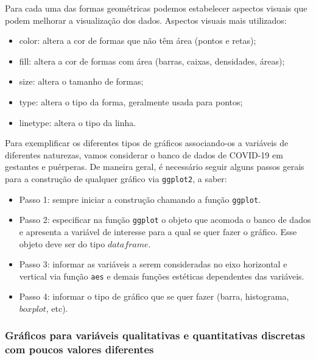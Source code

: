 \documentclass[
  letterpaper,
  DIV=11,
  numbers=noendperiod]{scrreprt}
\providecommand{\tightlist}{%
  \setlength{\itemsep}{0pt}\setlength{\parskip}{0pt}}\usepackage{longtable,booktabs,array}
\begin{document}
Para cada uma das formas geométricas podemos estabelecer aspectos
visuais que podem melhorar a visualização dos dados. Aspectos visuais
mais utilizados:

\begin{itemize}
\item
  color: altera a cor de formas que não têm área (pontos e retas);
\item
  fill: altera a cor de formas com área (barras, caixas, densidades,
  áreas);
\item
  size: altera o tamanho de formas;
\item
  type: altera o tipo da forma, geralmente usada para pontos;
\item
  linetype: altera o tipo da linha.
\end{itemize}

Para exemplificar os diferentes tipos de gráficos associando-os a
variáveis de diferentes naturezas, vamos considerar o banco de dados de
COVID-19 em gestantes e puérperas. De maneira geral, é necessário seguir
alguns passos gerais para a construção de qualquer gráfico via
\texttt{ggplot2}, a saber:

\begin{itemize}
\tightlist
\item
  Passo 1: sempre iniciar a construção chamando a função
  \texttt{ggplot}.
\item
  Passo 2: especificar na função \texttt{ggplot} o objeto que acomoda o
  banco de dados e apresenta a variável de interesse para a qual se quer
  fazer o gráfico. Esse objeto deve ser do tipo \(dataframe\).
\item
  Passo 3: informar as variáveis a serem consideradas no eixo horizontal
  e vertical via função \texttt{aes} e demais funções estéticas
  dependentes das variáveis.\\
\item
  Passo 4: informar o tipo de gráfico que se quer fazer (barra,
  histograma, \(boxplot\), etc).
\end{itemize}

\hypertarget{gruxe1ficos-para-variuxe1veis-qualitativas-e-quantitativas-discretas-com-poucos-valores-diferentes}{%
\subsubsection{Gráficos para variáveis qualitativas e quantitativas
discretas com poucos valores
diferentes}\label{gruxe1ficos-para-variuxe1veis-qualitativas-e-quantitativas-discretas-com-poucos-valores-diferentes}}
\end{document}
